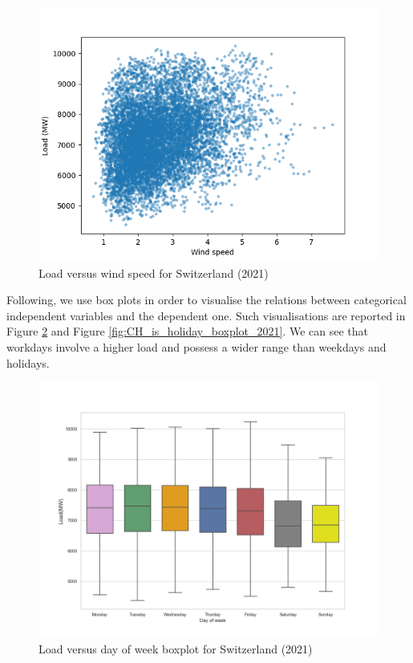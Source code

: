 \begin{figure}[!ht]
    \includegraphics[width=\textwidth]{images/CH_load_vs_wind_speed_2021.png}
    \caption{Load versus wind speed for Switzerland (2021)}
    \label{fig:CH_load_vs_wind_speed_2021}
\end{figure}

Following, we use box plots in order to visualise the relations between categorical independent variables and the dependent one. Such visualisations are reported in Figure \ref{fig:CH_day_of_week_boxplot_2021} and Figure \ref{fig:CH_is_holiday_boxplot_2021}. We can see that workdays involve a higher load and possess a wider range than weekdays and holidays.

\begin{figure}[!ht]
    \includegraphics[width=\textwidth]{images/CH_day_of_week_boxplot_2021.png}
    \caption{Load versus day of week boxplot for Switzerland (2021)}
    \label{fig:CH_day_of_week_boxplot_2021}
\end{figure}


